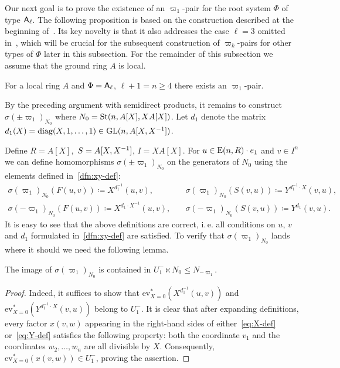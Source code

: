 Our next goal is to prove the existence of an $\varpi_1$-pair for the root system $\Phi$ of type $\mathsf{A}_\ell$.
The following proposition is based on the construction described at the beginning of~\cite[\S~3]{Tu83}.
Its key novelty is that it also addresses the case \( \ell = 3 \) omitted in~\cite{Tu83}, which will be crucial for the subsequent construction of \( \varpi_k \)-pairs for other types of \( \Phi \) later in this subsection.
For the remainder of this subsection we assume that the ground ring $A$ is local.

\begin{prop} \label{prop:sigma-construction}
    For a local ring $A$ and $\Phi = \mathsf{A}_\ell$, $\ell + 1 = n \geq 4$ there exists an $\varpi_1$-pair.
\end{prop}

By the preceding argument with semidirect products, it remains to construct $\sigma(\pm\varpi_1)_{N_0}$ where $N_0 = \operatorname{St}(n, A[X], XA[X])$.
Let \( d_1 \) denote the matrix $d_1(X) = \mathrm{diag}(X, 1, \ldots, 1) \in \operatorname{GL}(n, A[X, X^{-1}])$.

Define $R = A[X],$ $S = A[X, X^{-1}]$, $I = XA[X].$
For $u \in \operatorname{E}(n, R) \cdot e_1$ and $v \in I^n$ we can define homomorphisms $\sigma(\pm\varpi_1)_{N_0}$ on the generators of $N_{0}$ using the elements defined in~\cref{dfn:xy-def}:
\begin{align}
    \sigma(\varpi_1)_{N_0} \left(F(u, v)\right) \coloneqq X^{d_1^{-1}}(u, v), & \quad \sigma(\varpi_1)_{N_0} \left(S(v, u)\right) \coloneqq Y^{d_1^{-1} \cdot X}(v, u), \label{eq:def-sigma-1} \\
    \sigma(-\varpi_1)_{N_0} \left(F(u, v)\right) \coloneqq X^{d_1 \cdot X^{-1}}(u, v),& \quad \sigma(-\varpi_1)_{N_0} \left(S(v, u)\right) \coloneqq Y^{d_1}(v, u). \label{eq:def-sigma-2}
\end{align}
It is easy to see that the above definitions are correct, i.\,e. all conditions on $u$, $v$ and $d_1$ formulated in~\cref{dfn:xy-def} are satisfied.
To verify that $\sigma(\varpi_1)_{N_0}$ lands where it should we need the following lemma.
\begin{lemma}\label{lem:sigma-N0-image}
    The image of $\sigma(\varpi_1)_{N_0}$ is contained in $U_1^- \ltimes N_0 \leq N_{-\varpi_1}$.
\end{lemma}
\begin{proof}
Indeed, it suffices to show that $\mathrm{ev}_{X=0}^*(X^{d_1^{-1}}(u, v))$ and $\mathrm{ev}_{X=0}^*(Y^{d^{-1}_1 \cdot X}(v, u))$ belong to $U_1^-$.
It is clear that after expanding definitions, every factor $x(v, w)$ appearing in the right-hand sides of either~\eqref{eq:X-def} or~\eqref{eq:Y-def}
satisfies the following property: both the coordinate $v_1$ and the coordinates $w_2, \ldots, w_n$ are all divisible by $X$.
Consequently, $\mathrm{ev}_{X=0}^* \left(x(v, w)\right) \in U_1^-$, proving the assertion.
\end{proof}

